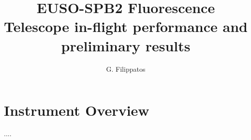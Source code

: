 \documentclass[a4paper,11pt]{article}
\title{EUSO-SPB2 Fluorescence Telescope in-flight performance and preliminary results }
\author*[a]{G. Filippatos}
\affiliation[a]{Colorado School of Mines, Golden, USA}
\begin{document}
\maketitle

\section{Instrument Overview}

\begin{thebibliography}{99}
....

\end{thebibliography}
\end{document}
